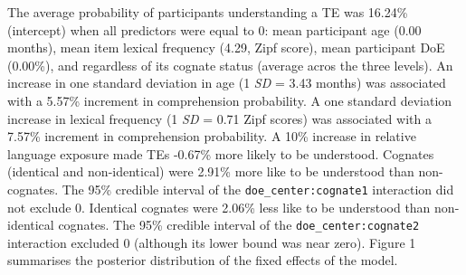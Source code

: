 \documentclass[
  english,
  man,man,floatsintext]{apa6}
\begin{document}
The average probability of participants understanding a TE was 16.24\% (intercept) when all predictors were equal to 0: mean participant age (0.00 months), mean item lexical frequency (4.29, Zipf score), mean participant DoE (0.00\%), and regardless of its cognate status (average acros the three levels). An increase in one standard deviation in age (1 \emph{SD} = 3.43 months) was associated with a 5.57\% increment in comprehension probability. A one standard deviation increase in lexical frequency (1 \emph{SD} = 0.71 Zipf scores) was associated with a 7.57\% increment in comprehension probability. A 10\% increase in relative language exposure made TEs -0.67\% more likely to be understood. Cognates (identical and non-identical) were 2.91\% more like to be understood than non-cognates. The 95\% credible interval of the \texttt{doe\_center:cognate1} interaction did not exclude 0. Identical cognates were 2.06\% less like to be understood than non-identical cognates. The 95\% credible interval of the \texttt{doe\_center:cognate2} interaction excluded 0 (although its lower bound was near zero). Figure 1 summarises the posterior distribution of the fixed effects of the model.
\end{document}
